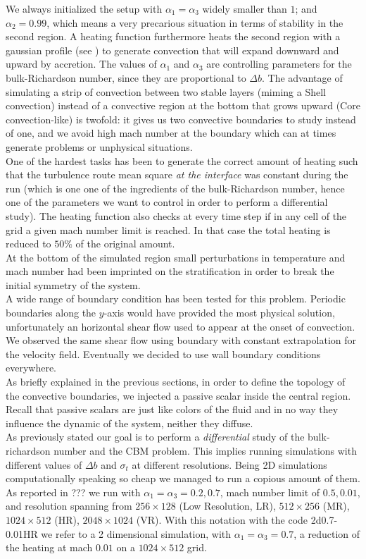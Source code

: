 We always initialized the setup with $\alpha_{1} = \alpha_{3}$ widely smaller than $1$; and $\alpha_{2}=0.99$, which means a very precarious situation in terms of stability in the second region. A heating function furthermore heats the second region with a gaussian profile (see \label{fig:tempprofile}) to generate convection that will expand downward and upward by accretion. The values of $\alpha_{1}$ and $\alpha_{3}$ are controlling parameters for the bulk-Richardson number, since they are proportional to $\Delta b$. The advantage of simulating a strip of convection between two stable layers (miming a Shell convection) instead of a convective region at the bottom that grows upward (Core convection-like) is twofold: it gives us two convective boundaries to study instead of one, and we avoid high mach number at the boundary which can at times generate problems or unphysical situations. \\
One of the hardest tasks has been to generate the correct amount of heating such that the turbulence route mean square \textit{at the interface} was constant during the run (which is one one of the ingredients of the bulk-Richardson number, hence one of the parameters we want to control in order to perform a differential study). The heating function also checks at every time step if in any cell of the grid a given mach number limit is reached. In that case the total heating is reduced to $50 \%$ of the original amount.\\ 
At the bottom of the simulated region small perturbations in temperature and mach number had been imprinted on the stratification in order to break the initial symmetry of the system.\\
A wide range of boundary condition has been tested for this problem. Periodic boundaries along the $y$-axis would have provided the most physical solution, unfortunately an horizontal shear flow used to appear at the onset of convection. We observed the same shear flow using boundary with constant extrapolation for the velocity field. Eventually we decided to use wall boundary conditions everywhere. \\
As briefly explained in the previous sections, in order to define the topology of the convective boundaries, we injected a passive scalar inside the central region. Recall that passive scalars are just like colors of the fluid and in no way they influence the dynamic of the system, neither they diffuse.\\
As previously stated our goal is to perform a \textit{differential} study of the bulk-richardson number and the CBM problem. This implies running simulations with different values of $\Delta b$ and $\sigma_t$ at different resolutions. Being 2D simulations computationally speaking so cheap we managed to run a copious amount of them. As reported in ??? we run with $\alpha_1=\alpha_3=0.2, 0.7$, mach number limit of $0.5, 0.01$, and resolution spanning from $256 \times 128$ (Low Resolution, LR), $512 \times 256$ (MR), $1024 \times 512$ (HR), $2048 \times 1024$ (VR). With this notation with the code 2d0.7-0.01HR we refer to a 2 dimensional simulation, with $\alpha_1=\alpha_3=0.7$, a reduction of the heating at mach $0.01$ on a $1024 \times 512$ grid. \\

